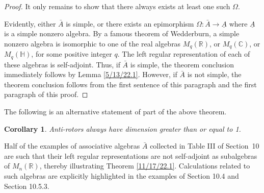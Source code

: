 \documentclass{amsart}
\numberwithin{equation}{section}
\newtheorem{corollary}[theorem]{Corollary}
\theoremstyle{definition}
\numberwithin{theorem}{section}
\begin{document}
\begin{proof}
  It only remains to show that there always exists at least one such $\Omega$. 
  
  Evidently, either $\bar{A}$ is simple, or there exists an epimorphism $\Omega:\bar{A}\rightarrow \underline{A}$ where $ \underline{A}$ is a simple nonzero algebra.   By a famous theorem of Wedderburn, a simple nonzero algebra is isomorphic to one of the real algebras $M_q(\mathbb{R})$, or $M_q(\mathbb{C})$, or $M_q(\mathbb{H})$, for some positive integer $q$.  The left regular representation of each of these algebras is self-adjoint.  Thus, if $\bar{A}$ is simple, the theorem conclusion immediately follows by Lemma \ref{5/13/22.1}.  However, if $\bar{A}$ is not simple, the theorem conclusion follows from the first sentence of this paragraph and the first paragraph of this proof.
  \end{proof}

 The following is an alternative statement of part of the above theorem.   
 
 \begin{corollary}\label{1/1/23.1} Anti-rotors always have dimension greater than or equal to 1. \end{corollary}


Half of the examples of associative algebras $\bar{A}$ collected in Table III of \mbox{Section 10} are such that their left regular representations are not self-adjoint as subalgebras of $M_n(\mathbb{R})$, thereby illustrating Theorem \ref{11/17/22.1}.  Calculations related to such algebras are explicitly highlighted in the examples of Section 10.4 and Section 10.5.3.

 
\end{document}
